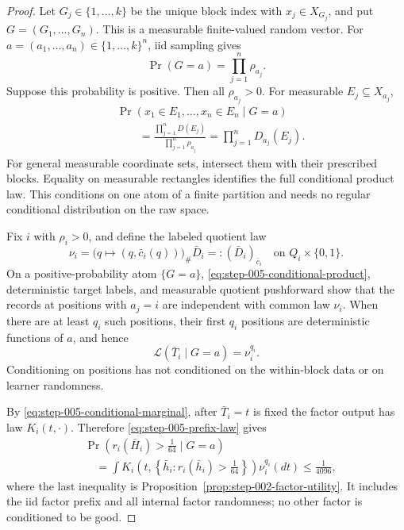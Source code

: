\begin{proof}
Let \(G_j\in\{1,\ldots,k\}\) be the unique block index with
\(x_j\in X_{G_j}\), and put \(G=(G_1,\ldots,G_n)\).  This is a measurable
finite-valued random vector.  For
\(a=(a_1,\ldots,a_n)\in\{1,\ldots,k\}^n\), iid sampling gives
\begin{equation}\label{eq:step-005-position-probability}
\Pr(G=a)=\prod_{j=1}^n\rho_{a_j}.
\end{equation}
Suppose this probability is positive.  Then all \(\rho_{a_j}>0\).  For
measurable \(E_j\subseteq X_{a_j}\),
\begin{equation}\label{eq:step-005-conditional-product}
\begin{split}
&\Pr(x_1\in E_1,\ldots,x_n\in E_n\mid G=a)\\
&\qquad=
\frac{\prod_{j=1}^nD(E_j)}{\prod_{j=1}^n\rho_{a_j}}
=\prod_{j=1}^nD_{a_j}(E_j).
\end{split}
\end{equation}
For general measurable coordinate sets, intersect them with their
prescribed blocks.  Equality on measurable rectangles identifies the full
conditional product law.  This conditions on one atom of a finite
partition and needs no regular conditional distribution on the raw space.

Fix \(i\) with \(\rho_i>0\), and define the labeled quotient law
\begin{equation}\label{eq:step-005-labeled-quotient-law}
\nu_i
=\bigl(q\mapsto(q,\bar c_i(q))\bigr)_\#\bar D_i
=:(\bar D_i)_{\bar c_i}
\quad\text{on }Q_i\times\{0,1\}.
\end{equation}
On a positive-probability atom \(\{G=a\}\),
\eqref{eq:step-005-conditional-product}, deterministic target labels, and
measurable quotient pushforward show that the records at positions with
\(a_j=i\) are independent with common law \(\nu_i\).  When there are at
least \(q_i\) such positions, their first \(q_i\) positions are
deterministic functions of \(a\), and hence
\begin{equation}\label{eq:step-005-prefix-law}
\mathcal L(\bar T_i\mid G=a)=\nu_i^{q_i}.
\end{equation}
Conditioning on positions has not conditioned on the within-block data or
on learner randomness.

By \eqref{eq:step-005-conditional-marginal}, after \(\bar T_i=t\) is
fixed the factor output has law \(K_i(t,\cdot)\).  Therefore
\eqref{eq:step-005-prefix-law} gives
\begin{equation}\label{eq:step-005-factor-utility-integral}
\begin{split}
&\Pr\!\left(r_i(\bar H_i)>\frac1{64}\mid G=a\right)\\
&\quad=
\int K_i\!\left(
t,\left\{\bar h_i:r_i(\bar h_i)>\frac1{64}\right\}
\right)\nu_i^{q_i}(dt)
\le\frac1{4096},
\end{split}
\end{equation}
where the last inequality is Proposition~\ref{prop:step-002-factor-utility}.
It includes the iid factor prefix and all internal factor randomness; no
other factor is conditioned to be good.


\end{proof}
